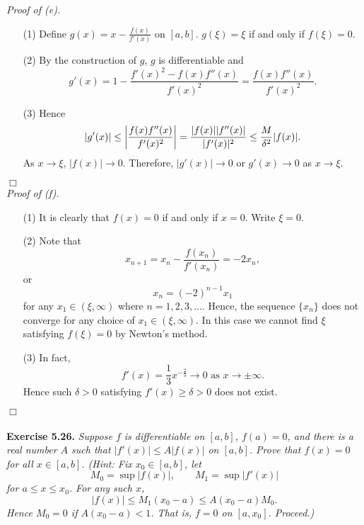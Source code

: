\documentclass{article}
\begin{document}
\emph{Proof of (e).}
\begin{enumerate}
\item[(1)]
Define $g(x) = x - \frac{f(x)}{f'(x)}$ on $[a,b]$.
$g(\xi) = \xi$ if and only if $f(\xi) = 0$.

\item[(2)]
By the construction of $g$, $g$ is differentiable and
\[
  g'(x)
  = 1 - \frac{f'(x)^2 - f(x) f''(x)}{f'(x)^2}
  = \frac{f(x) f''(x)}{f'(x)^2}.
\]

\item[(3)]
Hence
\[
  |g'(x)|
  \leq \abs{\frac{f(x) f''(x)}{f'(x)^2}}
  = \frac{|f(x)| |f''(x)|}{|f'(x)|^2}
  \leq \frac{M}{\delta^2} |f(x)|.
\]
As $x \to \xi$, $|f(x)| \to 0$.
Therefore,
$|g'(x)| \to 0$ or $g'(x) \to 0$ as $x \to \xi$.
\end{enumerate}
$\Box$ \\



\emph{Proof of (f).}
\begin{enumerate}
\item[(1)]
It is clearly that $f(x) = 0$ if and only if $x = 0$.
Write $\xi = 0$.

\item[(2)]
Note that
\[
  x_{n+1} = x_n - \frac{f(x_n)}{f'(x_n)} = -2 x_n,
\]
or
\[
  x_n = (-2)^{n-1} x_1
\]
for any $x_1 \in (\xi, \infty)$ where $n = 1, 2, 3, \ldots$.
Hence, the sequence $\{x_n\}$ does not converge for any choice of $x_1 \in (\xi, \infty)$.
In this case we cannot find $\xi$ satisfying $f(\xi) = 0$ by Newton's method.

\item[(3)]
In fact,
\[
  f'(x) = \frac{1}{3} x^{-\frac{2}{3}} \to 0 \text{ as } x \to \pm \infty.
\]
Hence such $\delta > 0$ satisfying $f'(x) \geq \delta > 0$ does not exist.
\end{enumerate}
$\Box$ \\\\






\textbf{Exercise 5.26.}
\emph{Suppose $f$ is differentiable on $[a,b]$, $f(a) = 0$,
and there is a real number $A$ such that $|f'(x)| \leq A|f(x)|$ on $[a,b]$.
Prove that $f(x)=0$ for all $x \in [a,b]$.
(Hint: Fix $x_0 \in [a,b]$, let
\[
  M_0 = \sup{|f(x)|}, \qquad M_1 = \sup{|f'(x)|}
\]
for $a \leq x \leq x_0$.
For any such $x$,
\[
  |f(x)| \leq M_1(x_0-a) \leq A(x_0-a) M_0.
\]
Hence $M_0 = 0$ if $A(x_0-a) < 1$.
That is, $f = 0$ on $[a,x_0]$.
Proceed.)} \\
\end{document}
